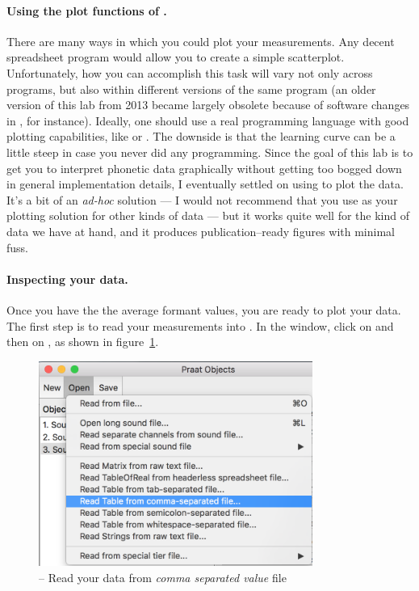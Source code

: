 \paragraph{Using the plot functions of \Praat{}.} There are many ways in which you could plot your measurements. Any decent spreadsheet program would allow you to create a simple scatterplot. Unfortunately, how you can accomplish this task will vary not only across programs, but also within different versions of the same program (an older version of this lab from 2013 became largely obsolete because of software changes in \MSExcel{}, for instance). Ideally, one should use a real programming language with good plotting capabilities, like  or . The downside is that the learning curve can be a little steep in case you never did any programming. Since the goal of this lab is to get you to interpret phonetic data graphically without getting too bogged down in general implementation details, I eventually settled on using \Praat{} to plot the data. It's a bit of an \emph{ad-hoc} solution --- I would not recommend that you use \Praat{} as your plotting solution for other kinds of data --- but it works quite well for the kind of data we have at hand, and it produces publication--ready figures with minimal fuss.

\paragraph{Inspecting your data.} Once you have the the average formant values, you are ready to plot your data. The first step is to read your measurements into \Praat{}. In the  window, click on  and then on , as shown in figure~\ref{praat-read-table-csv}.

\begin{figure}[!tbp]
\caption{\Praat{} -- Read your data from \emph{comma separated value} file}
\label{praat-read-table-csv}
	\begin{center}
		\includegraphics[width=0.8\textwidth]{./figures/Praat-11-Read-Table}
	\end{center}
\end{figure}

